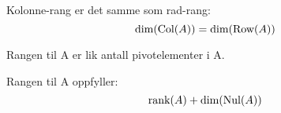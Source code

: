 Kolonne-rang er det samme som rad-rang:
$$\text{dim}(\text{Col}(A)) = \text{dim}(\text{Row}(A))$$

Rangen til A er lik antall pivotelementer i A.

Rangen til A oppfyller:
$$\text{rank}(A) + \text{dim}(\text{Nul}(A))$$
